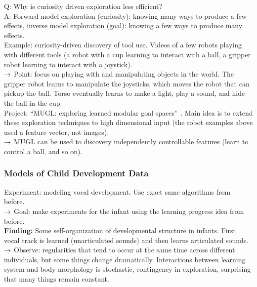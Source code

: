 Q: Why is curiosity driven exploration less efficient? \\

A: Forward model exploration (curiosity): knowing many ways to produce a few effects, inverse model exploration (goal): knowing a few ways to produce many effects. \\

Example: curiosity-driven discovery of tool use. Videos of a few robots playing with different tools (a robot with a cup learning to interact with a ball, a gripper robot learning to interact with a joystick). \\

$\rightarrow$ Point: focus on playing with and manipulating objects in the world. The gripper robot learns to manipulate the joysticks, which moves the robot that can pickup the ball. Torso eventually learns to make a light, play a sound, and hide the ball in the cup. \\

Project: ``MUGL: exploring learned modular goal spaces"~\cite{laversanne2018curiosity}. Main idea is to extend these exploration techniques to high dimensional input (the robot examples above used a feature vector, not images). \\

$\rightarrow$ MUGL can be used to discovery independently controllable features (learn to control a ball, and so on).

\subsubsection{Models of Child Development Data}

Experiment: modeling vocal development. Use exact same algorithms from before. \\

$\rightarrow$ Goal: make experiments for the infant using the learning progress idea from before. \\

{\bf Finding:} Some self-organization of developmental structure in infants. First vocal track is learned (unarticulated sounds) and then learns articulated sounds. \\

$\rightarrow$ Observe: regularities that tend to occur at the same time across different individuals, but some things change dramatically. Interactions between learning system and body morphology is stochastic, contingency in exploration, surprising that many things remain constant. \\

